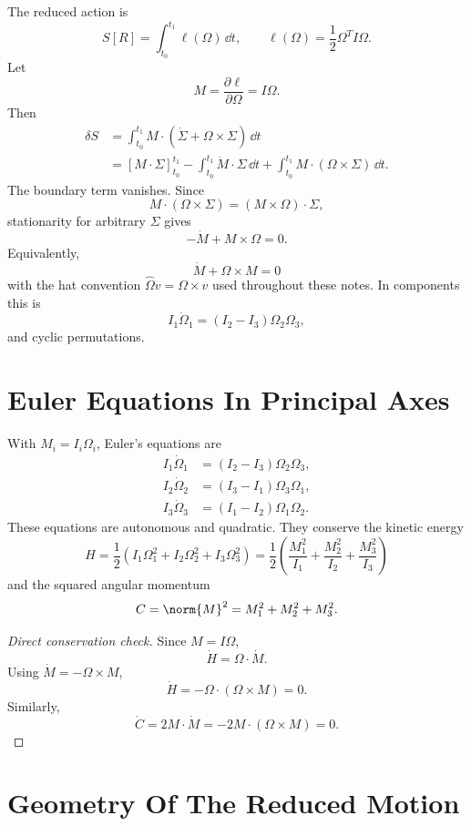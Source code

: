 \begin{derivation}
The reduced action is
\[
  S[R]=\int_{t_0}^{t_1}\ell(\Omega)\,\dd t,
  \qquad
  \ell(\Omega)=\frac12\Omega^TI\Omega.
\]
Let
\[
  M=\frac{\partial \ell}{\partial \Omega}=I\Omega.
\]
Then
\[
\begin{aligned}
  \delta S
  &=
  \int_{t_0}^{t_1} M\cdot(\dot\Sigma+\Omega\times\Sigma)\,\dd t\\
  &=
  \left[M\cdot\Sigma\right]_{t_0}^{t_1}
  -
  \int_{t_0}^{t_1}\dot M\cdot\Sigma\,\dd t
  +
  \int_{t_0}^{t_1}M\cdot(\Omega\times\Sigma)\,\dd t.
\end{aligned}
\]
The boundary term vanishes. Since
\[
  M\cdot(\Omega\times\Sigma)=(M\times\Omega)\cdot\Sigma,
\]
stationarity for arbitrary \(\Sigma\) gives
\[
  -\dot M+M\times\Omega=0.
\]
Equivalently,
\[
  \boxed{\dot M+\Omega\times M=0}
\]
with the hat convention \(\widehat\Omega v=\Omega\times v\) used throughout
these notes. In components this is
\[
  I_1\dot\Omega_1=(I_2-I_3)\Omega_2\Omega_3,
\]
and cyclic permutations.
\end{derivation}

\section{Euler Equations In Principal Axes}
\label{sec:euler-equations-principal}

With \(M_i=I_i\Omega_i\), Euler's equations are
\[
\begin{aligned}
  I_1\dot\Omega_1 &= (I_2-I_3)\Omega_2\Omega_3,\\
  I_2\dot\Omega_2 &= (I_3-I_1)\Omega_3\Omega_1,\\
  I_3\dot\Omega_3 &= (I_1-I_2)\Omega_1\Omega_2.
\end{aligned}
\]
These equations are autonomous and quadratic. They conserve the kinetic energy
\[
  H=\frac12(I_1\Omega_1^2+I_2\Omega_2^2+I_3\Omega_3^2)
  =
  \frac12\left(\frac{M_1^2}{I_1}+\frac{M_2^2}{I_2}+\frac{M_3^2}{I_3}\right)
\]
and the squared angular momentum
\[
  C=\norm{M}^2=M_1^2+M_2^2+M_3^2.
\]

\begin{proof}[Direct conservation check]
Since \(M=I\Omega\),
\[
  \dot H=\Omega\cdot \dot M.
\]
Using \(\dot M=-\Omega\times M\),
\[
  \dot H=-\Omega\cdot(\Omega\times M)=0.
\]
Similarly,
\[
  \dot C=2M\cdot\dot M=-2M\cdot(\Omega\times M)=0.
\]
\end{proof}

\section{Geometry Of The Reduced Motion}
\label{sec:rigid-reduced-geometry}

